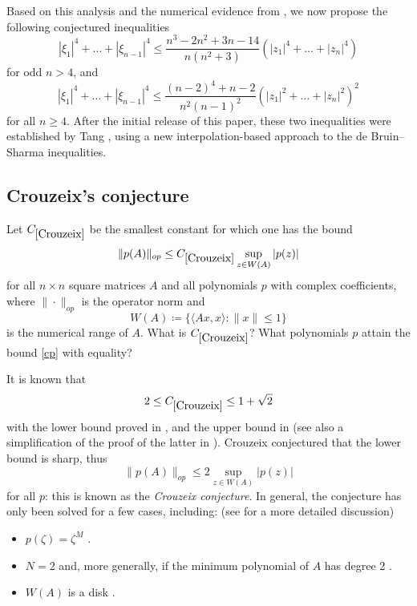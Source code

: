 Based on this analysis and the numerical evidence from \AlphaEvolve, we now propose the following conjectured inequalities
$$ |\xi_1|^4 + \dots + |\xi_{n-1}|^4 \leq \frac{n^3-2n^2+3n-14}{n(n^2+3)} (|z_1|^4 + \dots + |z_n|^4)$$
for odd $n > 4$, and
$$  |\xi_1|^4 + \dots + |\xi_{n-1}|^4 \leq \frac{(n-2)^4 + n-2}{n^2 (n-1)^2} (|z_1|^2 + \dots + |z_n|^2)^2$$
for all $n \geq 4$.  After the initial release of this paper, these two inequalities were established by Tang \cite{tang2025schoenberg}, using a new interpolation-based approach to the de Bruin--Sharma inequalities.






\subsection{Crouzeix's conjecture}

\renewcommand{\problemURL}{https://google-deepmind.github.io/alphaevolve_repository_of_problems/problems/25.html}

\begin{problem}\label{Crouzeix} Let $C_{\ref{Crouzeix}}$ be the smallest constant for which one has the bound
\begin{equation}\label{cp}
 \| p(A) \|_{op} \leq C_{\ref{Crouzeix}} \sup_{z \in W(A)} |p(z)|
\end{equation}
for all $n \times n$ square matrices $A$ and all polynomials $p$ with complex coefficients, where $\| \cdot \|_{op}$ is the operator norm and
$$ W(A) \coloneqq \{ \langle Ax, x \rangle: \|x\| \leq 1 \}$$
is the numerical range of $A$.  What is $C_{\ref{Crouzeix}}$?  What polynomials $p$ attain the bound \eqref{cp} with equality?
\end{problem}

It is known that
$$ 2 \leq C_{\ref{Crouzeix}} \leq 1 + \sqrt{2}$$
with the lower bound proved in \cite{crouzeix2004}, and the upper bound in \cite{crouzeix2017} (see also a simplification of the proof of the latter in \cite{ransford2018}).  Crouzeix \cite{crouzeix2004} conjectured that the lower bound is sharp, thus 
$$ \| p(A) \|_{op} \leq 2 \sup_{z \in W(A)} |p(z)|$$
for all $p$: this is known as the \textit{Crouzeix conjecture}. In general, the conjecture has only been solved for a few cases, including: (see \cite{greenbaum2017} for a more detailed discussion)
\begin{itemize}
\item $p(\zeta) = \zeta^M$ \cite{berger1965,pearcy1966}.
\item $N = 2$ and, more generally, if the minimum polynomial of $A$ has degree 2 \cite{crouzeix2004,tso1999}. 
\item $W(A)$ is a disk \cite[p. 462]{crouzeix2004}.
\end{itemize}

